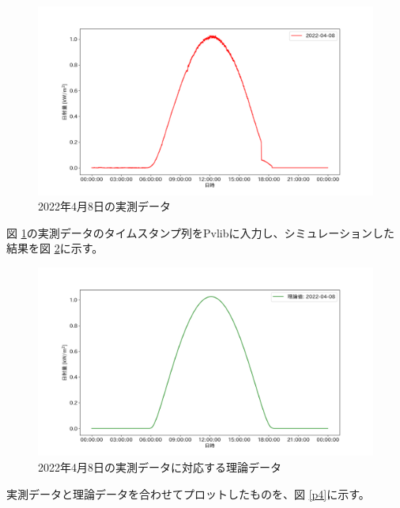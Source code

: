 \documentclass[a4j,12pt,]{jarticle}
\begin{document}
\begin{figure}[H]
  \begin{center}
    \includegraphics[width=160mm]{real.png}
    \caption{2022年4月8日の実測データ}
    \label{p2}
  \end{center}
\end{figure}

図 \ref{p2}の実測データのタイムスタンプ列をPvlibに入力し、シミュレーションした結果を図 \ref{p3}に示す。

\begin{figure}[H]
  \begin{center}
    \includegraphics[width=160mm]{theoretical.png}
    \caption{2022年4月8日の実測データに対応する理論データ}
    \label{p3}
  \end{center}
\end{figure}

実測データと理論データを合わせてプロットしたものを、図 \ref{p4}に示す。
\end{document}
